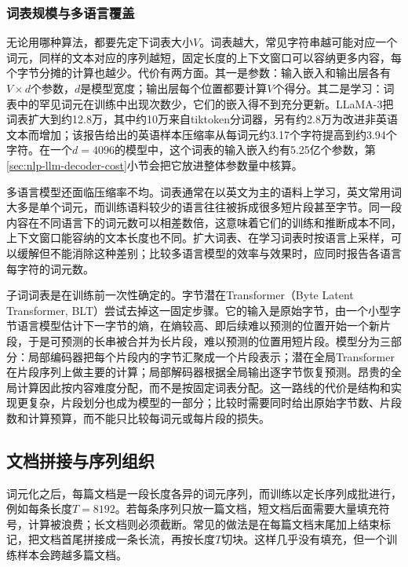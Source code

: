 \subsubsection{词表规模与多语言覆盖}
\label{sec:nlp-llm-vocabulary}

无论用哪种算法，都要先定下词表大小$V$。词表越大，常见字符串越可能对应一个词元，同样的文本对应的序列越短，固定长度的上下文窗口可以容纳更多内容，每个字节分摊的计算也越少。代价有两方面。其一是参数：输入嵌入和输出层各有$V\times d$个参数，$d$是模型宽度；输出层每个位置都要计算$V$个得分。其二是学习：词表中的罕见词元在训练中出现次数少，它们的嵌入得不到充分更新。LLaMA-3把词表扩大到约12.8万，其中约10万来自tiktoken分词器，另有约2.8万为改进非英语文本而增加；该报告给出的英语样本压缩率从每词元约3.17个字符提高到约3.94个字符。在一个$d=4096$的模型中，这个词表的输入嵌入约有5.25亿个参数，第\ref{sec:nlp-llm-decoder-cost}小节会把它放进整体参数量中核算。

多语言模型还面临压缩率不均。词表通常在以英文为主的语料上学习，英文常用词大多是单个词元，而训练语料较少的语言往往被拆成很多短片段甚至字节。同一段内容在不同语言下的词元数可以相差数倍，这意味着它们的训练和推断成本不同，上下文窗口能容纳的文本长度也不同。扩大词表、在学习词表时按语言上采样，可以缓解但不能消除这种差别；比较多语言模型的效率与效果时，应同时报告各语言每字符的词元数。

子词词表是在训练前一次性确定的。字节潜在Transformer（Byte Latent Transformer, BLT）尝试去掉这一固定步骤。它的输入是原始字节，由一个小型字节语言模型估计下一字节的熵，在熵较高、即后续难以预测的位置开始一个新片段，于是可预测的长串被合并为长片段，难以预测的位置用短片段。模型分为三部分：局部编码器把每个片段内的字节汇聚成一个片段表示；潜在全局Transformer在片段序列上做主要的计算；局部解码器根据全局输出逐字节恢复预测。昂贵的全局计算因此按内容难度分配，而不是按固定词表分配。这一路线的代价是结构和实现更复杂，片段划分也成为模型的一部分；比较时需要同时给出原始字节数、片段数和计算预算，而不能只比较每词元或每片段的损失。

\subsection{文档拼接与序列组织}
\label{sec:nlp-llm-data-packing}

词元化之后，每篇文档是一段长度各异的词元序列，而训练以定长序列成批进行，例如每条长度$T=8192$。若每条序列只放一篇文档，短文档后面需要大量填充符号，计算被浪费；长文档则必须截断。常见的做法是在每篇文档末尾加上结束标记，把文档首尾拼接成一条长流，再按长度$T$切块。这样几乎没有填充，但一个训练样本会跨越多篇文档。

